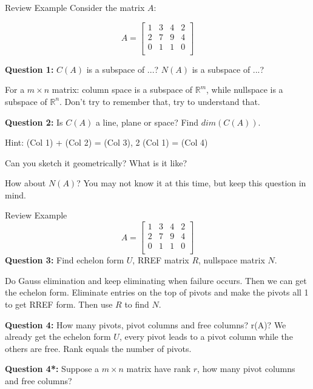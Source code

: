 \documentclass{beamer}
\begin{document}
\begin{frame}{Review Example}
Consider the matrix $A$:

\begin{equation*}
    A=\left[ \begin{matrix}
        1&		3&		4&		2\\
        2&		7&		9&		4\\
        0&		1&		1&		0\\
    \end{matrix} \right]
\end{equation*}

\textbf{Question 1:} $C(A)$ is a subspace of ...? $N(A)$ is a subspace of ...?

\vspace{3pt}
For a $m\times n$ matrix: column space is a subspace of $\mathbb{R}^m$, while nullspace is a subspace of $\mathbb{R}^n$.
Don't try to remember that, try to understand that.

\vspace{5pt}
\textbf{Question 2:} Is $C(A)$ a line, plane or space? Find $dim(C(A))$.

\vspace{3pt}
Hint: (Col 1) + (Col 2) = (Col 3), 2 (Col 1) = (Col 4)

\vspace{3pt}
Can you sketch it geometrically? What is it like?

\vspace{3pt}
How about $N(A)$? You may not know it at this time, but keep this question in mind.

\end{frame}

\begin{frame}{Review Example}
\begin{equation*}
    A=\left[ \begin{matrix}
        1&		3&		4&		2\\
        2&		7&		9&		4\\
        0&		1&		1&		0\\
    \end{matrix} \right]
\end{equation*}
\textbf{Question 3:} Find echelon form $U$, RREF matrix $R$, nullspace matrix $N$.

\vspace{3pt}
Do Gauss elimination and keep eliminating when failure occurs. Then we can get the echelon form.
Eliminate entries on the top of pivots and make the pivots all 1 to get RREF form. Then use $R$ to find $N$.

\vspace{5pt}
\textbf{Question 4:} How many pivots, pivot columns and free columns? r(A)?
We already get the echelon form $U$, every pivot leads to a pivot column while the others are free. Rank equals the number of pivots.

\vspace{5pt}
\textbf{Question 4*:} Suppose a $m \times n$ matrix have rank $r$, how many pivot columns and free columns?

\end{frame}
\end{document}
